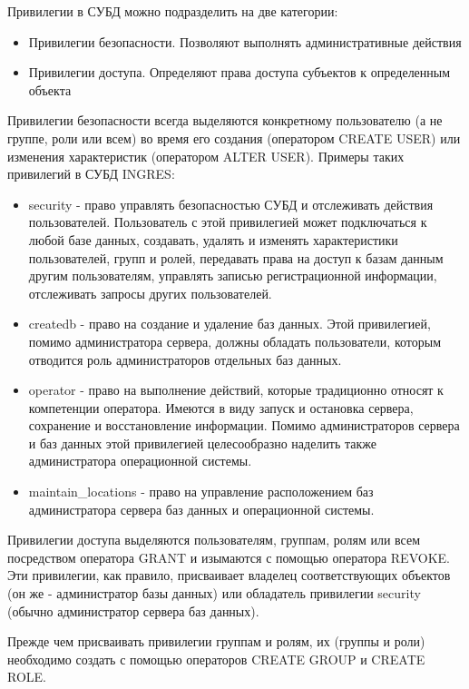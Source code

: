 Привилегии в СУБД можно подразделить на две категории:
\begin{itemize}
    \item Привилегии безопасности. Позволяют выполнять административные действия
    \item Привилегии доступа. Определяют права доступа субъектов к определенным объекта
\end{itemize}

Привилегии безопасности всегда выделяются конкретному пользователю (а не группе, роли или всем) во
время его создания (оператором CREATE USER) или изменения характеристик (оператором ALTER USER).
Примеры таких привилегий в СУБД INGRES:
\begin{itemize}
    \item security - право управлять безопасностью СУБД и отслеживать действия
        пользователей. Пользователь с этой привилегией может подключаться к любой базе
        данных, создавать, удалять и изменять характеристики пользователей, групп и ролей,
        передавать права на доступ к базам данным другим пользователям, управлять
        записью регистрационной информации, отслеживать запросы других пользователей.
    \item createdb - право на создание и удаление баз данных. Этой привилегией,
        помимо администратора сервера, должны обладать пользователи, которым отводится
        роль администраторов отдельных баз данных.
    \item operator - право на выполнение действий, которые традиционно относят к
        компетенции оператора. Имеются в виду запуск и остановка сервера, сохранение и
        восстановление информации. Помимо администраторов сервера и баз данных этой
        привилегией целесообразно наделить также администратора операционной системы.
    \item maintain\_locations - право на управление расположением баз администратора
        сервера баз данных и операционной системы.
\end{itemize}

Привилегии доступа выделяются пользователям, группам, ролям или всем посредством оператора GRANT и
изымаются с помощью оператора REVOKE. Эти привилегии, как правило, присваивает владелец
соответствующих объектов (он же - администратор базы данных) или обладатель привилегии security
(обычно администратор сервера баз данных).

Прежде чем присваивать привилегии группам и ролям, их (группы и роли) необходимо создать с помощью
операторов CREATE GROUP и CREATE ROLE.

